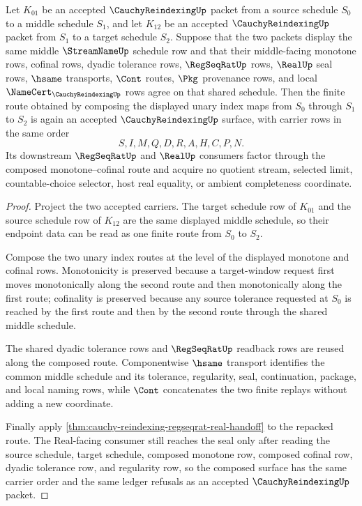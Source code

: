 \begin{theorem}
\label{thm:cauchy-reindexing-composition-stability}
Let $K_{01}$ be an accepted $\CauchyReindexingUp$ packet from a source schedule $S_0$ to a middle schedule $S_1$, and let $K_{12}$ be an accepted $\CauchyReindexingUp$ packet from $S_1$ to a target schedule $S_2$. Suppose that the two packets display the same middle $\StreamNameUp$ schedule row and that their middle-facing monotone rows, cofinal rows, dyadic tolerance rows, $\RegSeqRatUp$ rows, $\RealUp$ seal rows, $\hsame$ transports, $\Cont$ routes, $\Pkg$ provenance rows, and local $\NameCert_{\CauchyReindexingUp}$ rows agree on that shared schedule. Then the finite route obtained by composing the displayed unary index maps from $S_0$ through $S_1$ to $S_2$ is again an accepted $\CauchyReindexingUp$ surface, with carrier rows in the same order
$$
S,I,M,Q,D,R,A,H,C,P,N .
$$
Its downstream $\RegSeqRatUp$ and $\RealUp$ consumers factor through the composed monotone--cofinal route and acquire no quotient stream, selected limit, countable-choice selector, host real equality, or ambient completeness coordinate.
\end{theorem}
\begin{proof}
Project the two accepted carriers. The target schedule row of $K_{01}$ and the source schedule row of $K_{12}$ are the same displayed middle schedule, so their endpoint data can be read as one finite route from $S_0$ to $S_2$.

Compose the two unary index routes at the level of the displayed monotone and cofinal rows. Monotonicity is preserved because a target-window request first moves monotonically along the second route and then monotonically along the first route; cofinality is preserved because any source tolerance requested at $S_0$ is reached by the first route and then by the second route through the shared middle schedule.

The shared dyadic tolerance rows and $\RegSeqRatUp$ readback rows are reused along the composed route. Componentwise $\hsame$ transport identifies the common middle schedule and its tolerance, regularity, seal, continuation, package, and local naming rows, while $\Cont$ concatenates the two finite replays without adding a new coordinate.

Finally apply \autoref{thm:cauchy-reindexing-regseqrat-real-handoff} to the repacked route. The Real-facing consumer still reaches the seal only after reading the source schedule, target schedule, composed monotone row, composed cofinal row, dyadic tolerance row, and regularity row, so the composed surface has the same carrier order and the same ledger refusals as an accepted $\CauchyReindexingUp$ packet.
\end{proof}

